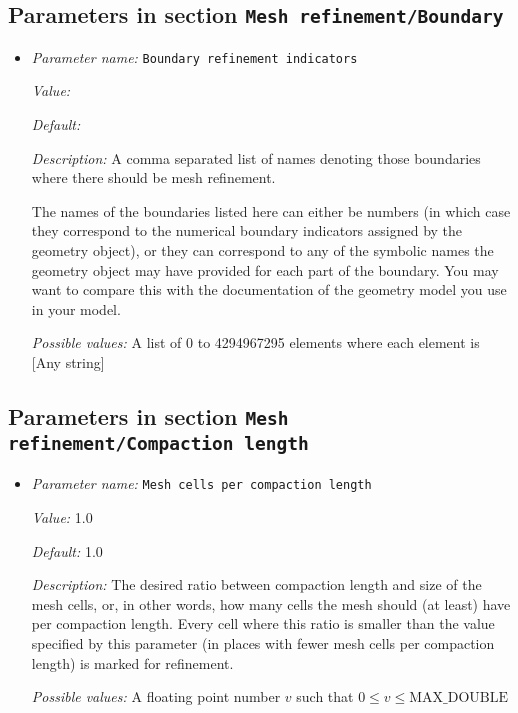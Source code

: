 \subsection{Parameters in section \tt Mesh refinement/Boundary}
\label{parameters:Mesh_20refinement/Boundary}

\begin{itemize}
\item {\it Parameter name:} {\tt Boundary refinement indicators}
\label{parameters:Mesh refinement/Boundary/Boundary refinement indicators}
\label{parameters:Mesh_20refinement/Boundary/Boundary_20refinement_20indicators}


{\it Value:} 


{\it Default:} 


{\it Description:} A comma separated list of names denoting those boundaries where there should be mesh refinement.

The names of the boundaries listed here can either be numbers (in which case they correspond to the numerical boundary indicators assigned by the geometry object), or they can correspond to any of the symbolic names the geometry object may have provided for each part of the boundary. You may want to compare this with the documentation of the geometry model you use in your model.


{\it Possible values:} A list of 0 to 4294967295 elements where each element is [Any string]
\end{itemize}

\subsection{Parameters in section \tt Mesh refinement/Compaction length}
\label{parameters:Mesh_20refinement/Compaction_20length}

\begin{itemize}
\item {\it Parameter name:} {\tt Mesh cells per compaction length}
\label{parameters:Mesh refinement/Compaction length/Mesh cells per compaction length}
\label{parameters:Mesh_20refinement/Compaction_20length/Mesh_20cells_20per_20compaction_20length}


{\it Value:} 1.0


{\it Default:} 1.0


{\it Description:} The desired ratio between compaction length and size of the mesh cells, or, in other words, how many cells the mesh should (at least) have per compaction length. Every cell where this ratio is smaller than the value specified by this parameter (in places with fewer mesh cells per compaction length) is marked for refinement.


{\it Possible values:} A floating point number $v$ such that $0 \leq v \leq \text{MAX\_DOUBLE}$
\end{itemize}

